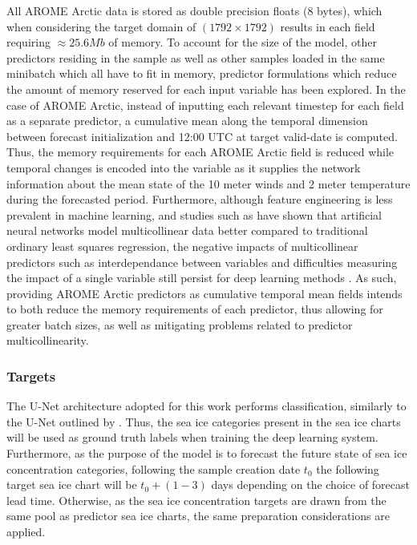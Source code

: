 \documentclass[../main/thesis]{subfiles}
\begin{document}
All AROME Arctic data is stored as double precision floats (8 bytes), which when considering the target domain of $(1792 \times 1792)$ results in each field requiring $\approx 25.6 Mb$ of memory. To account for the size of the model, other predictors residing in the sample as well as other samples loaded in the same minibatch which all have to fit in memory, predictor formulations which reduce the amount of memory reserved for each input variable has been explored. In the case of AROME Arctic, instead of inputting each relevant timestep for each field as a separate predictor, a cumulative mean along the temporal dimension between forecast initialization and 12:00 UTC at target valid-date is computed. Thus, the memory requirements for each AROME Arctic field is reduced while temporal changes is encoded into the variable as it supplies the network information about the mean state of the 10 meter winds and 2 meter temperature during the forecasted period. Furthermore, although feature engineering is less prevalent in machine learning, and studies such as \citet{Obite2020} have shown that artificial neural networks model multicollinear data better compared to traditional ordinary least squares regression, the negative impacts of multicollinear predictors such as interdependance between variables and difficulties measuring the impact of a single variable still persist for deep learning methods \citep{Chan2022}. As such, providing AROME Arctic predictors as cumulative temporal mean fields intends to both reduce the memory requirements of each predictor, thus allowing for greater batch sizes, as well as mitigating problems related to predictor multicollinearity.  

\subsubsection{Targets}
The U-Net architecture adopted for this work performs classification, similarly to the U-Net outlined by \citet{Ronneberger2015}. Thus, the sea ice categories present in the sea ice charts \citet{Dinessen2020} will be used as ground truth labels when training the deep learning system. Furthermore, as the purpose of the model is to forecast the future state of sea ice concentration categories, following the sample creation date $t_0$ the following target sea ice chart will be $t_0 + (1 - 3)$ days depending on the choice of forecast lead time. Otherwise, as the sea ice concentration targets are drawn from the same pool as predictor sea ice charts, the same preparation considerations are applied.
\end{document}
